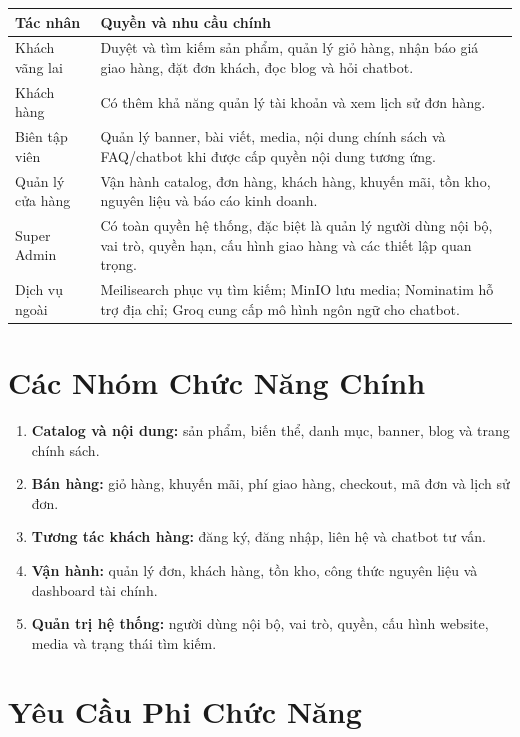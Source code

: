 \begin{longtable}{@{}L{0.22\textwidth} L{0.70\textwidth}@{}}
  \toprule
  \textbf{Tác nhân} & \textbf{Quyền và nhu cầu chính} \\
  \midrule
  \endhead
  Khách vãng lai & Duyệt và tìm kiếm sản phẩm, quản lý giỏ hàng, nhận báo giá giao hàng, đặt đơn khách, đọc blog và hỏi chatbot. \\[3pt]
  Khách hàng & Có thêm khả năng quản lý tài khoản và xem lịch sử đơn hàng. \\[3pt]
  Biên tập viên & Quản lý banner, bài viết, media, nội dung chính sách và FAQ/chatbot khi được cấp quyền nội dung tương ứng. \\[3pt]
  Quản lý cửa hàng & Vận hành catalog, đơn hàng, khách hàng, khuyến mãi, tồn kho, nguyên liệu và báo cáo kinh doanh. \\[3pt]
  Super Admin & Có toàn quyền hệ thống, đặc biệt là quản lý người dùng nội bộ, vai trò, quyền hạn, cấu hình giao hàng và các thiết lập quan trọng. \\[3pt]
  Dịch vụ ngoài & Meilisearch phục vụ tìm kiếm; MinIO lưu media; Nominatim hỗ trợ địa chỉ; Groq cung cấp mô hình ngôn ngữ cho chatbot. \\
  \bottomrule
\end{longtable}

\section{Các Nhóm Chức Năng Chính}

\begin{enumerate}[leftmargin=2.2em, itemsep=4pt]
  \item \textbf{Catalog và nội dung:} sản phẩm, biến thể, danh mục, banner, blog và trang chính sách.
  \item \textbf{Bán hàng:} giỏ hàng, khuyến mãi, phí giao hàng, checkout, mã đơn và lịch sử đơn.
  \item \textbf{Tương tác khách hàng:} đăng ký, đăng nhập, liên hệ và chatbot tư vấn.
  \item \textbf{Vận hành:} quản lý đơn, khách hàng, tồn kho, công thức nguyên liệu và dashboard tài chính.
  \item \textbf{Quản trị hệ thống:} người dùng nội bộ, vai trò, quyền, cấu hình website, media và trạng thái tìm kiếm.
\end{enumerate}

\section{Yêu Cầu Phi Chức Năng}

